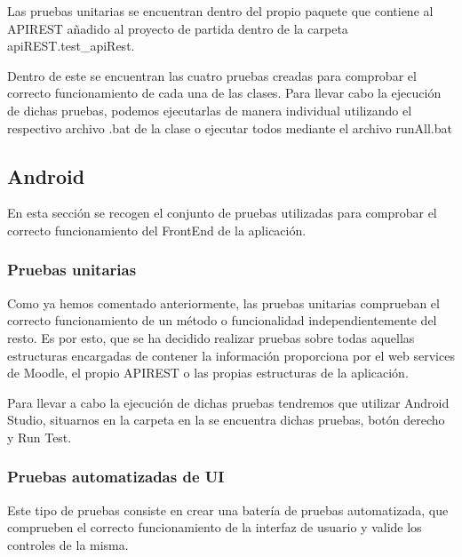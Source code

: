 Las pruebas unitarias se encuentran dentro del propio paquete que contiene al APIREST añadido al proyecto de partida dentro de la carpeta apiREST.test\_apiRest. 


Dentro de este se encuentran las cuatro pruebas creadas para comprobar el correcto funcionamiento de cada una de las clases. Para llevar cabo la ejecución de dichas pruebas, podemos ejecutarlas de manera individual utilizando el respectivo archivo .bat de la clase  o ejecutar todos mediante el archivo runAll.bat

\subsection{Android}

En esta sección se recogen el conjunto de pruebas utilizadas para comprobar el correcto funcionamiento del FrontEnd de la aplicación.

\subsubsection{Pruebas unitarias}

Como ya hemos comentado anteriormente, las pruebas unitarias comprueban el correcto funcionamiento de un método o funcionalidad independientemente del resto. Es por esto, que se ha decidido realizar pruebas sobre todas aquellas estructuras encargadas de contener la información proporciona por el web services de Moodle, el propio APIREST o las propias estructuras de la aplicación.


Para llevar a cabo la ejecución de dichas pruebas tendremos que utilizar Android Studio, situarnos en la carpeta en la se encuentra dichas pruebas, botón derecho y Run Test.


\subsubsection{Pruebas automatizadas de UI}

Este tipo de pruebas consiste en crear una batería de pruebas automatizada, que comprueben el correcto funcionamiento de la interfaz de usuario y valide los controles de la misma. 

